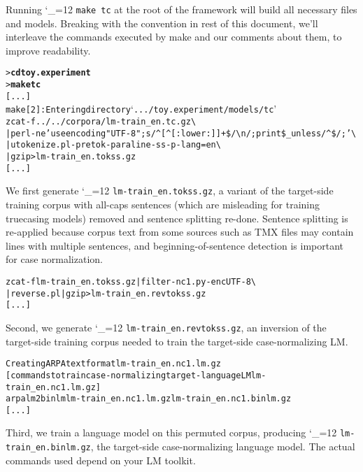 \documentclass[11pt,letterpaper]{article}
\newcommand{\bs}{\textbackslash{}}
\newcommand{\TODO}[1]{\emph{\textbf{\textcolor{red}{<TODO> #1 </TODO>}}}}
\def\code{\begingroup\catcode`\_=12 \codex}
\newcommand{\codex}[1]{\texttt{#1}\endgroup}
\begin{document}

Running \code{make tc} at the root of the framework will build all necessary
files and models.  Breaking with the convention in rest of this document, we'll
interleave the commands executed by make and our comments about them, to
improve readability.

\begin{small}
\begin{alltt}
   > \textbf{cd toy.experiment}
   > \textbf{make tc}
   [...]
   make[2]: Entering directory `.../toy.experiment/models/tc'
   zcat -f ../../corpora/lm-train_en.tc.gz \bs
        | perl -ne 'use encoding "UTF-8"; s/^[^[:lower:]]+\$/{\bs}n/; print \$_ unless /^\$/;' \bs
        | utokenize.pl -pretok -paraline -ss -p -lang=en \bs
        | gzip > lm-train_en.tokss.gz
   [...]
\end{alltt}
\end{small}

We first generate \code{lm-train_en.tokss.gz}, a variant of the target-side
training corpus with all-caps sentences (which are misleading for training
truecasing models) removed and sentence splitting re-done.  Sentence splitting
is re-applied because corpus text from some sources such as TMX files may
contain lines with multiple sentences, and beginning-of-sentence detection is
important for case normalization.

\begin{small}
\begin{alltt}
   zcat -f lm-train_en.tokss.gz | filter-nc1.py -enc UTF-8 \bs
        | reverse.pl | gzip > lm-train_en.revtokss.gz
   [...]
\end{alltt}
\end{small}

Second, we generate \code{lm-train_en.revtokss.gz}, an inversion of the
target-side training corpus needed to train the target-side case-normalizing
LM.

\begin{small}
\begin{alltt}
   Creating ARPA text format lm-train_en.nc1.lm.gz
   [commands to train case-normalizing target-language LM lm-train_en.nc1.lm.gz]
   arpalm2binlm lm-train_en.nc1.lm.gz lm-train_en.nc1.binlm.gz
   [...]
\end{alltt}
\end{small}

Third, we train a language model on this permuted corpus, producing
\code{lm-train_en.binlm.gz}, the target-side case-normalizing language model.
The actual commands used depend on your LM toolkit.
\end{document}
